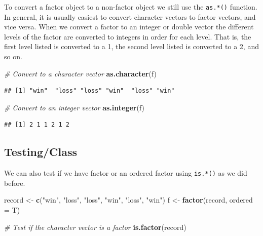 \documentclass[
]{book}
\newenvironment{Shaded}{\begin{snugshade}}{\end{snugshade}}
\newcommand{\CommentTok}[1]{\textcolor[rgb]{0.56,0.35,0.01}{\textit{#1}}}
\newcommand{\DataTypeTok}[1]{\textcolor[rgb]{0.13,0.29,0.53}{#1}}
\newcommand{\KeywordTok}[1]{\textcolor[rgb]{0.13,0.29,0.53}{\textbf{#1}}}
\newcommand{\NormalTok}[1]{#1}
\newcommand{\StringTok}[1]{\textcolor[rgb]{0.31,0.60,0.02}{#1}}
\begin{document}
To convert a factor object to a non-factor object we still use the \texttt{as.*()} function. In general, it is usually easiest to convert character vectors to factor vectors, and vice versa. When we convert a factor to an integer or double vector the different levels of the factor are converted to integers in order for each level. That is, the first level listed is converted to a 1, the second level listed is converted to a 2, and so on.

\begin{Shaded}
\begin{Highlighting}[]
\CommentTok{# Convert to a character vector}
\KeywordTok{as.character}\NormalTok{(f)}
\end{Highlighting}
\end{Shaded}

\begin{verbatim}
## [1] "win"  "loss" "loss" "win"  "loss" "win"
\end{verbatim}

\begin{Shaded}
\begin{Highlighting}[]
\CommentTok{# Convert to an integer vector}
\KeywordTok{as.integer}\NormalTok{(f)}
\end{Highlighting}
\end{Shaded}

\begin{verbatim}
## [1] 2 1 1 2 1 2
\end{verbatim}

\hypertarget{testingclass}{%
\subsection{Testing/Class}\label{testingclass}}

We can also test if we have factor or an ordered factor using \texttt{is.*()} as we did before.

\begin{Shaded}
\begin{Highlighting}[]
\NormalTok{record <-}\StringTok{ }\KeywordTok{c}\NormalTok{(}\StringTok{"win"}\NormalTok{, }\StringTok{"loss"}\NormalTok{, }\StringTok{"loss"}\NormalTok{, }\StringTok{"win"}\NormalTok{, }\StringTok{"loss"}\NormalTok{, }\StringTok{"win"}\NormalTok{)}
\NormalTok{f <-}\StringTok{ }\KeywordTok{factor}\NormalTok{(record, }\DataTypeTok{ordered =}\NormalTok{ T)}


\CommentTok{# Test if the character vector is a factor}
\KeywordTok{is.factor}\NormalTok{(record)}
\end{Highlighting}
\end{Shaded}
\end{document}
